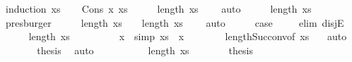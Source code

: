 \begin{isabellebody}
%
\isadelimproof
%
\endisadelimproof
%
\isatagproof
{}\isamarkupfalse%
\ {\isacharparenleft}{\kern0pt}induction\ xs{\isacharparenright}{\kern0pt}\isanewline
\ \ \isamarkupfalse%
\ {\isacharparenleft}{\kern0pt}Cons\ x\ xs{\isacharparenright}{\kern0pt}\isanewline
\ \ \isamarkupfalse%
\ \isamarkupfalse%
\ {\isachardoublequoteopen}length\ xs\ {\isachargreater}{\kern0pt}\ {}{\isachardoublequoteclose}\ \isamarkupfalse%
\ auto\isanewline
\ \ \isamarkupfalse%
\ \isamarkupfalse%
\ {\isachardoublequoteopen}length\ xs\ {\isasymge}\ {}{\isachardoublequoteclose}\ \isamarkupfalse%
\ presburger\isanewline
\ \ \isamarkupfalse%
\ \isamarkupfalse%
\ {\isachardoublequoteopen}length\ xs\ {\isacharequal}{\kern0pt}\ {}\ {\isasymor}\ length\ xs\ {\isachargreater}{\kern0pt}\ {}{\isachardoublequoteclose}\ \isamarkupfalse%
\ auto\isanewline
\ \ \isamarkupfalse%
\ \isamarkupfalse%
\ {\isacharquery}{\kern0pt}case\ \isanewline
\ \ \isamarkupfalse%
\ {\isacharparenleft}{\kern0pt}elim\ disjE{\isacharparenright}{\kern0pt}\isanewline
\ \ \ \ \isamarkupfalse%
\ {\isachardoublequoteopen}length\ xs\ {\isacharequal}{\kern0pt}\ {}{\isachardoublequoteclose}\isanewline
\ \ \ \ \isamarkupfalse%
\ \isamarkupfalse%
\ x\ \ {\isacharbrackleft}{\kern0pt}simp{\isacharbrackright}{\kern0pt}{\isacharcolon}{\kern0pt}\ {\isachardoublequoteopen}xs\ {\isacharequal}{\kern0pt}\ {\isacharbrackleft}{\kern0pt}x\isanewline
\ \ \ \ \ \ \isamarkupfalse%
\ length{\isacharunderscore}{\kern0pt}Suc{\isacharunderscore}{\kern0pt}conv{\isacharbrackleft}{\kern0pt}of\ xs\ {}{\isacharbrackright}{\kern0pt}\ \isamarkupfalse%
\ auto\isanewline
\ \ \ \ \isamarkupfalse%
\ \isamarkupfalse%
\ {\isacharquery}{\kern0pt}thesis\ \isamarkupfalse%
\ auto\isanewline
\ \ \isamarkupfalse%
\isanewline
\ \ \ \ \isamarkupfalse%
\ {\isachardoublequoteopen}{}\ {\isacharless}{\kern0pt}\ length\ xs{\isachardoublequoteclose}\isanewline
\ \ \ \ \isamarkupfalse%
\ \isamarkupfalse%
\ {\isacharquery}{\kern0pt}thesis\ \isamarkupfalse%

\end{isabellebody}
